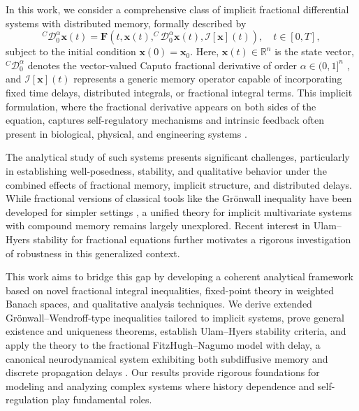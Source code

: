 \documentclass[12pt,a4paper]{article}
\numberwithin{equation}{section}
\begin{document}
	In this work, we consider a comprehensive class of implicit fractional differential systems with distributed memory, formally described by
	\begin{equation}
		^{C}\mathcal{D}_{0}^{\alpha} \mathbf{x}(t) = \mathbf{F}\left(t, \mathbf{x}(t), ^{C}\mathcal{D}_{0}^{\alpha} \mathbf{x}(t), \mathcal{I}[\mathbf{x}](t)\right), \quad t \in [0, T],
		\label{eq:general_system}
	\end{equation}
	subject to the initial condition $\mathbf{x}(0) = \mathbf{x}_0$. Here, $\mathbf{x}(t) \in \mathbb{R}^n$ is the state vector, $^{C}\mathcal{D}_{0}^{\alpha}$ denotes the vector-valued Caputo fractional derivative of order $\alpha \in (0,1]^n$ \cite{kilbas2006}, and $\mathcal{I}[\mathbf{x}](t)$ represents a generic memory operator capable of incorporating fixed time delays, distributed integrals, or fractional integral terms. This implicit formulation, where the fractional derivative appears on both sides of the equation, captures self-regulatory mechanisms and intrinsic feedback often present in biological, physical, and engineering systems \cite{shabbir2021,abdalla2026}. 
	
	The analytical study of such systems presents significant challenges, particularly in establishing well-posedness, stability, and qualitative behavior under the combined effects of fractional memory, implicit structure, and distributed delays. While fractional versions of classical tools like the Grönwall inequality have been developed for simpler settings \cite{cheung2008,yang2025}, a unified theory for implicit multivariate systems with compound memory remains largely unexplored. Recent interest in Ulam--Hyers stability for fractional equations \cite{dilna2024,elsayed2024} further motivates a rigorous investigation of robustness in this generalized context.
	
	This work aims to bridge this gap by developing a coherent analytical framework based on novel fractional integral inequalities, fixed-point theory in weighted Banach spaces, and qualitative analysis techniques. We derive extended Grönwall--Wendroff-type inequalities tailored to implicit systems, prove general existence and uniqueness theorems, establish Ulam--Hyers stability criteria, and apply the theory to the fractional FitzHugh--Nagumo model with delay, a canonical neurodynamical system exhibiting both subdiffusive memory and discrete propagation delays \cite{area2016}. Our results provide rigorous foundations for modeling and analyzing complex systems where history dependence and self-regulation play fundamental roles.
	
\end{document}
